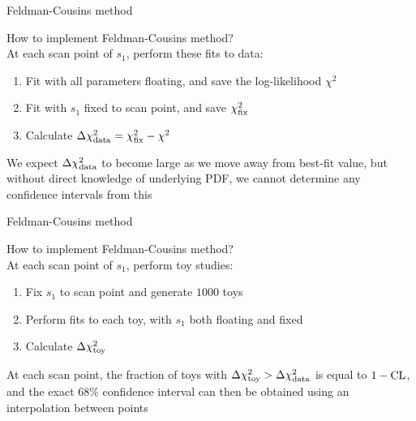 \documentclass{beamer}
\begin{document}
\begin{frame}{Feldman-Cousins method}
  \begin{center}
    {\Large How to implement Feldman-Cousins method?} \\
    {At each scan point of $s_1$, perform these fits to data:}
  \end{center}
  \begin{enumerate}
    \setlength\itemsep{0.5em}
    \item{Fit with all parameters floating, and save the log-likelihood $\chi^2$}
    \item{Fit with $s_1$ fixed to scan point, and save $\chi^2_{\rm fix}$}
    \item{Calculate $\Delta\chi^2_{\rm data} = \chi^2_{\rm fix} - \chi^2$}
  \end{enumerate}
  \vspace{0.5cm}
  \begin{center}
    {We expect $\Delta\chi^2_{\rm data}$ to become large as we move away from best-fit value, but without direct knowledge of underlying PDF, we cannot determine any confidence intervals from this}
  \end{center}
\end{frame}

\begin{frame}{Feldman-Cousins method}
  \begin{center}
    {\Large How to implement Feldman-Cousins method?} \\
    {At each scan point of $s_1$, perform toy studies:}
  \end{center}
  \begin{enumerate}
    \setlength\itemsep{0.5em}
    \item{Fix $s_1$ to scan point and generate $1000$ toys}
    \item{Perform fits to each toy, with $s_1$ both floating and fixed}
    \item{Calculate $\Delta\chi^2_{\rm toy}$}
  \end{enumerate}
  \vspace{0.5cm}
  \begin{center}
    {At each scan point, the fraction of toys with $\Delta\chi^2_{\rm toy} > \Delta\chi^2_{\rm data}$ is equal to $1 - \rm{CL}$, and the exact $68\%$ confidence interval can then be obtained using an interpolation between points}
  \end{center}
\end{frame}
\end{document}
